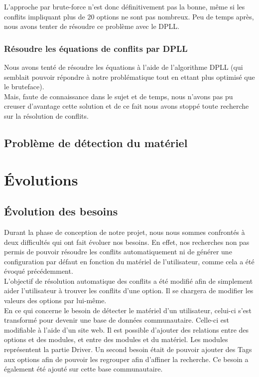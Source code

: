 \documentclass[17pts]{report}
\begin{document}
L'approche par brute-force n'est donc définitivement pas la bonne, même si les
conflits impliquant plus de 20 options ne sont pas nombreux.
Peu de temps après, nous avons tenter de résoudre ce problème avec le DPLL.\\

\subsubsection{Résoudre les équations de conflits par DPLL}
\label{sub:Résoudre les équations de conflits par DPLL}

Nous avons tenté de résoudre les équations à l'aide de l'algorithme DPLL (qui
semblait pouvoir répondre à notre problématique tout en ettant plus optimisé
que le bruteface).\\
Mais, faute de connaissance dans le sujet et de temps, nous n'avons pas pu
creuser d'avantage cette solution et de ce fait nous avons stoppé toute
recherche sur la résolution de conflits.\\

\subsection{Problème de détection du matériel}
\label{sub:Problème de détection du matériel}

\section{Évolutions}
\label{sec:Évolutions}
\subsection{Évolution des besoins}
\label{sec:Évolution des besoins}

Durant la phase de conception de notre projet, nous nous sommes confrontés à
deux difficultés qui ont fait évoluer nos besoins. En effet, nos recherches non
pas permis de pouvoir résoudre les conflits automatiquement ni de générer une
configuration par défaut en fonction du matériel de l'utilisateur, comme cela a
été évoqué précédemment.  \\

L'objectif de résolution automatique des conflits a été modifié afin de
simplement aider l'utilisateur à trouver les conflits d'une option. Il se
chargera de modifier les valeurs des options par lui-même.  \\

En ce qui concerne le besoin de détecter le matériel d'un utilisateur, celui-ci
s'est transformé pour devenir une base de données communautaire. Celle-ci est
modifiable à l'aide d'un site web. Il est possible d'ajouter des relations
entre des options et des modules, et entre des modules et du matériel. Les
modules représentent la partie Driver. Un second besoin était de pouvoir
ajouter des Tags aux options afin de pouvoir les regrouper afin d'affiner la
recherche. Ce besoin a également été ajouté sur cette base communautaire.
\end{document}
